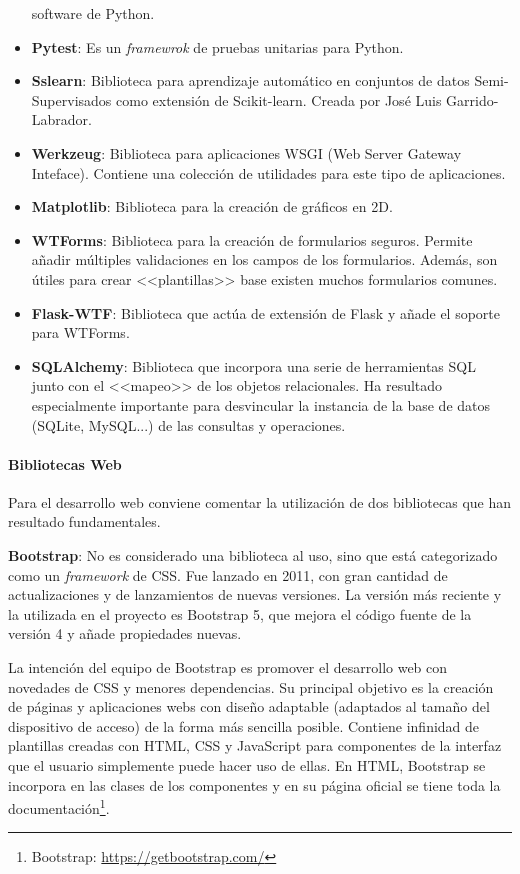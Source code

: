 \begin{itemize}
	software de Python.
	\item \textbf{Pytest}: Es un \emph{framewrok} de pruebas unitarias para
	Python.
	\item \textbf{Sslearn}: Biblioteca para aprendizaje automático en conjuntos de
	datos Semi-Supervisados como extensión de Scikit-learn. Creada por José Luis
	Garrido-Labrador.
	\item \textbf{Werkzeug}: Biblioteca para aplicaciones WSGI (Web Server Gateway
	Inteface). Contiene una colección de utilidades para este tipo de
	aplicaciones.
	\item \textbf{Matplotlib}: Biblioteca para la creación de gráficos en 2D.
	\item \textbf{WTForms}: Biblioteca para la creación de formularios seguros.
	Permite añadir múltiples validaciones en los campos de los formularios.
	Además, son útiles para crear <<plantillas>> base existen muchos formularios
	comunes.
	\item \textbf{Flask-WTF}: Biblioteca que actúa de extensión de Flask y añade
	el soporte para WTForms.
	\item \textbf{SQLAlchemy}: Biblioteca que incorpora una serie de herramientas
	SQL junto con el <<mapeo>> de los objetos relacionales. Ha resultado
	especialmente importante para desvincular la instancia de la base de datos
	(SQLite, MySQL...) de las consultas y operaciones.
\end{itemize}

\paragraph{Bibliotecas Web} Para el desarrollo web conviene comentar la
utilización de dos bibliotecas que han resultado fundamentales.

\textbf{Bootstrap}: No es considerado una biblioteca al uso, sino que está
categorizado como un \emph{framework} de CSS. Fue lanzado en 2011, con gran
cantidad de actualizaciones y de lanzamientos de nuevas versiones. La versión
más reciente y la utilizada en el proyecto es Bootstrap 5, que mejora el código
fuente de la versión 4 y añade propiedades nuevas. 

La intención del equipo de Bootstrap es promover el desarrollo web con novedades
de CSS y menores dependencias. Su principal objetivo es la creación de páginas y
aplicaciones webs con diseño adaptable (adaptados al tamaño del dispositivo de
acceso) de la forma más sencilla posible. Contiene infinidad de plantillas
creadas con HTML, CSS y JavaScript para componentes de la interfaz que el
usuario simplemente puede hacer uso de ellas. En HTML, Bootstrap se incorpora en
las clases de los componentes y en su página oficial se tiene toda la
documentación\footnote{Bootstrap: \url{https://getbootstrap.com/}}.

